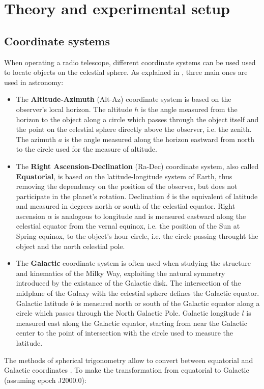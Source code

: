 \section{Theory and experimental setup}
\subsection{Coordinate systems}
When operating a radio telescope, different coordinate systems can be used used to locate objects on the celestial sphere.
As explained in \cite{carroll_introduction_2007}, three main ones are used in astronomy:
\begin{itemize}
    \item The \textbf{Altitude-Azimuth} (Alt-Az) coordinate system is based on the observer's local horizon. The altitude $h$ is the angle measured from the horizon to the object along a circle which passes through the object itself and the point on the celestial sphere directly above the observer, i.e. the zenith. The azimuth $a$ is the angle measured along the horizon eastward from north to the circle used for the measure of altitude.
    \item The \textbf{Right Ascension-Declination} (Ra-Dec) coordinate system, also called \textbf{Equatorial}, is based on the latitude-longitude system of Earth, thus removing the dependency on the position of the observer, but does not participate in the planet's rotation. Declination $\delta$ is the equivalent of latitude and measured in degrees north or south of the celestial equator. Right ascension $\alpha$ is analogous to longitude and is measured eastward along the celestial equator from the vernal equinox, i.e. the position of the Sun at Spring equinox, to the object's hour circle, i.e. the circle passing throught the object and the north celestial pole.
    \item The \textbf{Galactic} coordinate system is often used when studying the structure and kinematics of the Milky Way, exploiting the natural symmetry introduced by the existance of the Galactic disk. The intersection of the midplane of the Galaxy with the celestial sphere defines the Galactic equator. Galactic latitude $b$ is measured north or south of the Galactic equator along a circle which passes through the North Galactic Pole. Galactic longitude $l$ is measured east along the Galactic equator, starting from near the Galactic center to the point of intersection with the circle used to measure the latitude.
\end{itemize}
The methods of spherical trigonometry allow to convert between equatorial and Galactic coordinates \Cite{carroll_introduction_2007}. To make the transformation from equatorial to Galactic (assuming epoch J2000.0):
